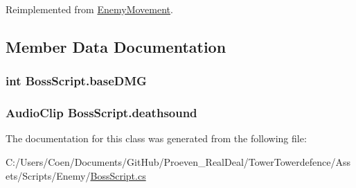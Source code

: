 Reimplemented from \hyperlink{class_enemy_movement_a69cfde4faddeed6aa261b7ceeb8173f7}{Enemy\+Movement}.



\subsection{Member Data Documentation}
\subsubsection[{\texorpdfstring{base\+D\+MG}{baseDMG}}]{\setlength{\rightskip}{0pt plus 5cm}int Boss\+Script.\+base\+D\+MG}\hypertarget{class_boss_script_a8fd5488da526f98323da34328f9323a4}{}\label{class_boss_script_a8fd5488da526f98323da34328f9323a4}
\subsubsection[{\texorpdfstring{deathsound}{deathsound}}]{\setlength{\rightskip}{0pt plus 5cm}Audio\+Clip Boss\+Script.\+deathsound}\hypertarget{class_boss_script_ac49ed64c18bbda37c0d6d584c7055695}{}\label{class_boss_script_ac49ed64c18bbda37c0d6d584c7055695}


The documentation for this class was generated from the following file\+:\begin{DoxyCompactItemize}
\item 
C\+:/\+Users/\+Coen/\+Documents/\+Git\+Hub/\+Proeven\+\_\+\+Real\+Deal/\+Tower\+Towerdefence/\+Assets/\+Scripts/\+Enemy/\hyperlink{_boss_script_8cs}{Boss\+Script.\+cs}\end{DoxyCompactItemize}
